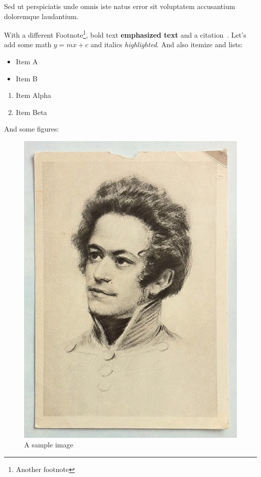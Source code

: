 Sed ut perspiciatis unde omnis iste natus error sit voluptatem accusantium doloremque laudantium.

With a different Footnote\footnote{Another footnote}, bold text \textbf{emphasized text} and a citation~\cite{einstein2013principle}. Let's add some math $y = mx + c$ and italics \textit{highlighted}. And also itemize and lists:
\begin{itemize}
	\item Item A
	\item Item B
\end{itemize}
\begin{enumerate}
	\item Item Alpha
	\item Item Beta
\end{enumerate}
And some figures:
\begin{figure}[H]
	\centering
	\includegraphics[scale=0.5]{../resources/sample-image.png}
	\caption{A sample image}
	\label{fig:sample}
\end{figure}

